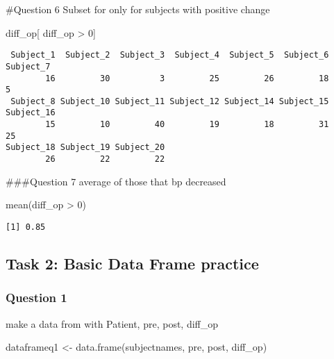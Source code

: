 \documentclass[
  letterpaper,
  DIV=11,
  numbers=noendperiod]{scrartcl}
\newenvironment{Shaded}{\begin{snugshade}}{\end{snugshade}}
\newcommand{\DecValTok}[1]{\textcolor[rgb]{0.68,0.00,0.00}{#1}}
\newcommand{\FunctionTok}[1]{\textcolor[rgb]{0.28,0.35,0.67}{#1}}
\newcommand{\NormalTok}[1]{\textcolor[rgb]{0.00,0.23,0.31}{#1}}
\newcommand{\OtherTok}[1]{\textcolor[rgb]{0.00,0.23,0.31}{#1}}
\newcommand{\SpecialCharTok}[1]{\textcolor[rgb]{0.37,0.37,0.37}{#1}}
\begin{document}
\#Question 6 Subset for only for subjects with positive change

\begin{Shaded}
\begin{Highlighting}[]
\NormalTok{diff\_op[ diff\_op }\SpecialCharTok{\textgreater{}} \DecValTok{0}\NormalTok{] }
\end{Highlighting}
\end{Shaded}

\begin{verbatim}
 Subject_1  Subject_2  Subject_3  Subject_4  Subject_5  Subject_6  Subject_7 
        16         30          3         25         26         18          5 
 Subject_8 Subject_10 Subject_11 Subject_12 Subject_14 Subject_15 Subject_16 
        15         10         40         19         18         31         25 
Subject_18 Subject_19 Subject_20 
        26         22         22 
\end{verbatim}

\#\#\#Question 7 average of those that bp decreased

\begin{Shaded}
\begin{Highlighting}[]
\FunctionTok{mean}\NormalTok{(diff\_op }\SpecialCharTok{\textgreater{}} \DecValTok{0}\NormalTok{)}
\end{Highlighting}
\end{Shaded}

\begin{verbatim}
[1] 0.85
\end{verbatim}

\subsection{Task 2: Basic Data Frame
practice}\label{task-2-basic-data-frame-practice}

\subsubsection{Question 1}\label{question-1}

make a data from with Patient, pre, post, diff\_op

\begin{Shaded}
\begin{Highlighting}[]
\NormalTok{dataframeq1 }\OtherTok{\textless{}{-}} \FunctionTok{data.frame}\NormalTok{(subjectnames, pre, post, diff\_op)}
\end{Highlighting}
\end{Shaded}
\end{document}
